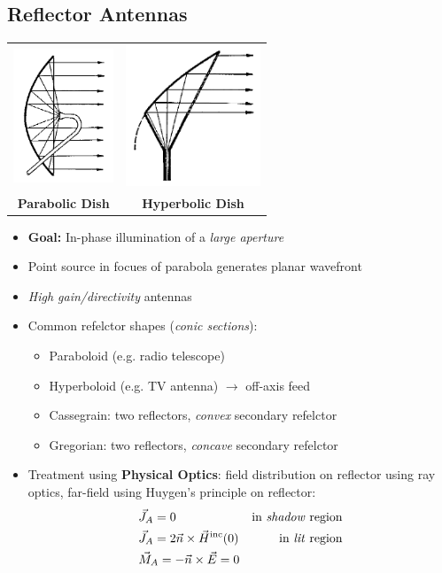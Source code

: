 \subsection{Reflector Antennas}
\begin{tabular}{cc}
    \includegraphics[width=3cm]{content/aawp/pictures/parabolic_reflector_antenna.png}
    &\includegraphics[width=4cm]{content/aawp/pictures/hyperbolic_reflector_antenna.png}\\
    \textbf{Parabolic Dish} & \textbf{Hyperbolic Dish}
\end{tabular}
\begin{itemize}
    \itemsep0pt
    \item \textbf{Goal:} In-phase illumination of a \textit{large aperture}
    \item Point source in focues of parabola generates planar wavefront
    \item \textit{High gain/directivity} antennas
    \item Common refelctor shapes (\textit{conic sections}):
        \begin{itemize}
            \itemsep0pt
            \item Paraboloid (e.g. radio telescope)
            \item Hyperboloid (e.g. TV antenna) $\to$ off-axis feed
            \item Cassegrain: two reflectors, \textit{convex} secondary refelctor
            \item Gregorian: two reflectors, \textit{concave} secondary refelctor
        \end{itemize}
    \item Treatment using \textbf{Physical Optics}: field distribution on reflector using ray optics, far-field using Huygen's principle on reflector:
        \begin{align*}
            &\vec{J}_A = 0 &\text{in \textit{shadow} region}\\
            &\vec{J}_A = 2\vec{n} \times\vec{H}^{\mathrm{inc}}(0) &\text{in \textit{lit} region}\\
            &\vec{M}_A = -\vec{n}\times\vec{E} = 0
        \end{align*}
\end{itemize}
